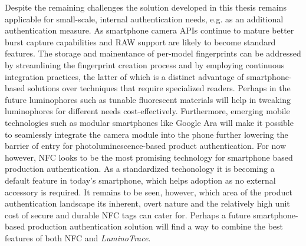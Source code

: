 \documentclass[thesis.tex]{subfiles}
\begin{document}
Despite the remaining challenges the solution developed in this thesis remains applicable for small-scale, internal authentication needs, e.g. as an additional authentication measure. As smartphone camera APIs continue to mature better burst capture capabilities and RAW support are likely to become standard features. The storage and mainentance of per-model fingerprints can be addressed by streamlining the fingerprint creation process and by employing continuous integration practices, the latter of which is a distinct advantage of smartphone-based solutions over techniques that require specialized readers. Perhaps in the future luminophores such as tunable fluorescent materials will help in tweaking luminophores for different needs cost-effectively. Furthermore, emerging mobile technologies such as modular smartphones like Google Ara will make it possible to seamlessly integrate the camera module into the phone further lowering the barrier of entry for photoluminescence-based product authentication. For now however, NFC looks to be the most promising technology for smartphone based production authentication. As a standardized techonology it is becoming a default feature in today's smartphone, which helps adoption as no external accessory is required. It remains to be seen, however, which area of the product authentication landscape its inherent, overt nature and the relatively high unit cost of secure and durable NFC tags can cater for. Perhaps a future smartphone-based production authentication solution will find a way to combine the best features of both NFC and \emph{LuminoTrace}.
\end{document}
